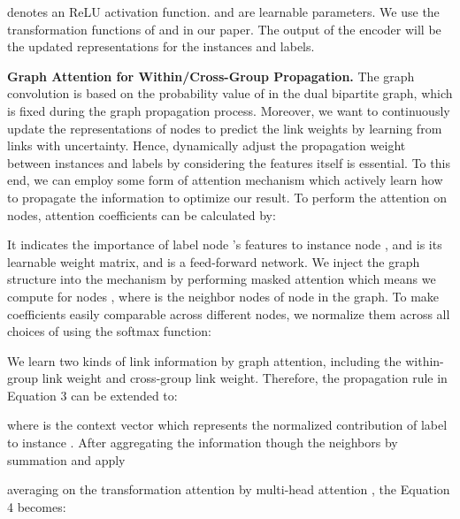 \documentclass[letterpaper]{article} \usepackage{aaai20}  \usepackage{times}  \usepackage{helvet} \usepackage{courier}  \usepackage[hyphens]{url}  \usepackage{graphicx} \urlstyle{rm} \def\UrlFont{\rm}  \frenchspacing  \setlength{\pdfpagewidth}{8.5in}  \setlength{\pdfpageheight}{11in}  \frenchspacing
\begin{document}
 denotes an ReLU activation function.  and  are learnable parameters.
We use the transformation functions of  and  in our paper. The output of the encoder will be the updated representations  for the instances and labels. 



\noindent\textbf{Graph Attention for Within/Cross-Group Propagation.}
The graph convolution is based on the probability value of in the dual bipartite graph, which is fixed during the graph propagation process. Moreover, we want to continuously update the representations of nodes to predict the link weights by learning from links with uncertainty. Hence, dynamically adjust the propagation weight between instances and labels by considering the features itself is essential. 
To this end, we can 
employ some form of attention mechanism \cite{velivckovic2017graph} which actively learn how to propagate the information to optimize our result. To perform the attention on nodes, attention coefficients can be calculated by: 


It indicates the importance of label node 's features to instance node , and  is its learnable weight matrix, and  is a feed-forward network. We inject the graph structure into the mechanism by performing masked attention which means we compute  for nodes , where  is the neighbor nodes of node  in the graph.
To make coefficients easily comparable across different nodes, we normalize them across all choices of  using the softmax function:


\noindent We learn two kinds of link information by graph attention, including the within-group link weight and cross-group link weight. 
Therefore, the propagation rule in Equation 3 can be extended to:

where  is the context vector which represents the normalized contribution of label  to instance . 
After aggregating the information though the neighbors by summation and apply
\iffalse
, the Equation 3 becames: 

 and  are the updated feature after multiplying the attention coefficient.

To stabilize the learning process, we employ multi-head attention \cite{zitnik2017predicting} to be beneficial. Specifically,  independent attention mechanisms execute the transformation of Equation 9, and then their features are concatenated. 
Later, we apply 
\fi
averaging on the  transformation attention by multi-head attention \cite{zitnik2017predicting}, the Equation 4 becomes: 
\end{document}
